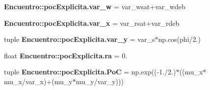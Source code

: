 \begin{DoxyCompactItemize}
\item 
{\bf \-Encuentro\-::poc\-Explicita.\-var\-\_\-w} = var\-\_\-wsat+var\-\_\-wdeb
\item 
{\bf \-Encuentro\-::poc\-Explicita.\-var\-\_\-x} = var\-\_\-rsat+var\-\_\-rdeb
\item 
tuple {\bf \-Encuentro\-::poc\-Explicita.\-var\-\_\-y} = var\-\_\-s$\ast$np.\-cos(phi/2.)
\item 
float {\bf \-Encuentro\-::poc\-Explicita.\-ra} = 0.
\item 
tuple {\bf \-Encuentro\-::poc\-Explicita.\-Po\-C} = np.\-exp((-\/1./2.)$\ast$((mu\-\_\-x$\ast$mu\-\_\-x/var\-\_\-x)+(mu\-\_\-y$\ast$mu\-\_\-y/var\-\_\-y)))
\end{DoxyCompactItemize}
